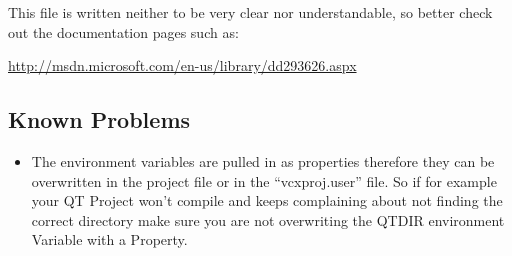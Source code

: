This file is written neither to be very clear nor understandable, so
better check out the documentation pages such as:

\url{http://msdn.microsoft.com/en-us/library/dd293626.aspx}

\subsection{Known Problems}

\begin{itemize}
\item The environment variables are pulled in as properties therefore they can be overwritten in the project file or in the ``vcxproj.user'' file. So if for example your QT Project won't compile and keeps complaining about not finding the correct directory make sure you are not overwriting the QTDIR environment Variable with a Property. 
\end{itemize}